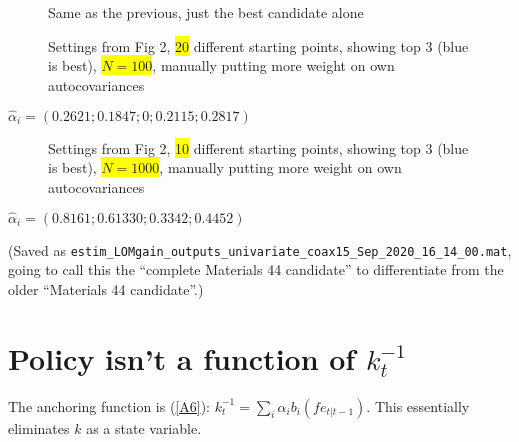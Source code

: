 \documentclass[11pt]{article}
\def \myFigPath {../../figures/}
\renewcommand{\[}{\begin{equation}}
\renewcommand{\]}{\end{equation}}
\begin{document}
\clearpage
\begin{figure}[h!]
\caption{Same as the previous, just the best candidate alone}
\end{figure}

\clearpage
\begin{figure}[h!]
\caption{Settings from Fig 2,  \colorbox{yellow}{20} different starting points, showing top 3 (blue is best),  \colorbox{yellow}{$N=100$}, manually putting more weight on own autocovariances}
\end{figure}


$\hat{\alpha}_i = (0.2621;    0.1847;    0;    0.2115;    0.2817)$

\clearpage
\begin{figure}[h!]
\caption{Settings from Fig 2,  \colorbox{yellow}{10} different starting points, showing top 3 (blue is best),  \colorbox{yellow}{$N=1000$}, manually putting more weight on own autocovariances}
\end{figure}


$\hat{\alpha}_i = (0.8161;    0.6133    0;    0.3342;    0.4452)$

(Saved as \texttt{estim\_LOMgain\_outputs\_univariate\_coax15\_Sep\_2020\_16\_14\_00.mat}, going to call this the ``complete Materials 44 candidate'' to differentiate from the older ``Materials 44 candidate''.)


\clearpage
\section{Policy isn't a function of $k^{-1}_t$}
The anchoring function is (\ref{A6}): $k^{-1}_t  = \sum_i \alpha_i b_i(fe_{t|t-1})$. This essentially eliminates $k$ as a state variable. 
\end{document}
